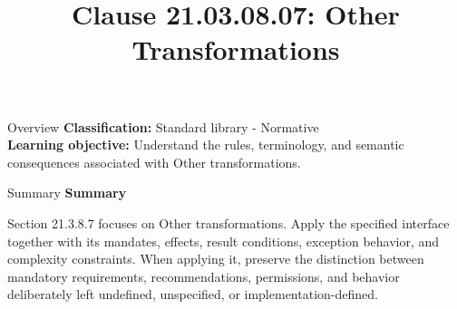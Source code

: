 \documentclass[10pt,letterpaper]{article}
\title{Clause 21.03.08.07: Other Transformations}
\author{}
\date{}
\begin{document}
\maketitle
\begin{CornellOverviewBox}{Overview}
\textbf{Classification:} Standard library - Normative\\[2pt]
\textbf{Learning objective:} Understand the rules, terminology, and semantic consequences associated with Other transformations.
\end{CornellOverviewBox}\begin{CornellSummaryBox}{Summary}
{\sffamily\bfseries\color{Accent} Summary}\par\vspace{3pt}Section 21.3.8.7 focuses on Other transformations. Apply the specified interface together with its mandates, effects, result conditions, exception behavior, and complexity constraints. When applying it, preserve the distinction between mandatory requirements, recommendations, permissions, and behavior deliberately left undefined, unspecified, or implementation-defined.
\end{CornellSummaryBox}
\end{document}
